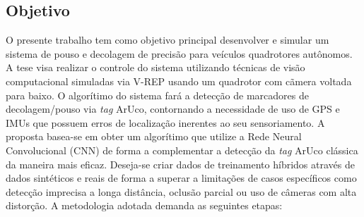 

\subsection{Objetivo}

O presente trabalho tem como objetivo principal desenvolver e simular um sistema de pouso e decolagem de precisão para veículos quadrotores autônomos. A tese visa realizar o controle do sistema utilizando técnicas de visão computacional simuladas via V-REP usando um quadrotor com cãmera voltada para baixo. O algorítimo do sistema fará a detecção de marcadores de decolagem/pouso via \textit{tag} ArUco, contornando a necessidade de uso de GPS e IMUs que possuem erros de localização inerentes ao seu sensoriamento. A proposta basea-se em obter um algorítimo que utilize a Rede Neural Convolucional (CNN) de forma a complementar a detecção da \textit{tag} ArUco clássica da maneira mais eficaz. Deseja-se criar dados de treinamento híbridos através de dados sintéticos e reais de forma a superar a limitações de casos específicos como detecção imprecisa a longa distância, oclusão parcial ou uso de câmeras com alta distorção. A metodologia adotada demanda as seguintes etapas:

